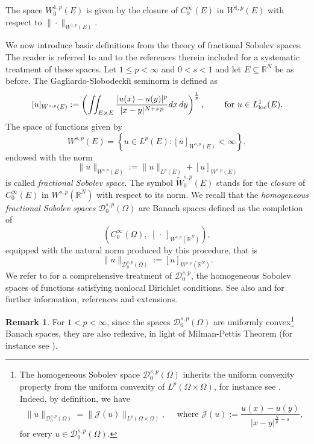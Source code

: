 \documentclass{amsart}
\theoremstyle{definition}
\newtheorem{remark}[theorem]{Remark}
\numberwithin{equation}{section}
\begin{document}
	The space $W^{1,p}_0(E)$ is given by the closure of $C^{\infty}_0(E)$ in $W^{1,p}(E)$ with respect to $\|\cdot\|_{W^{1,p}(E)}$.
	\par 
	We now introduce basic definitions from the theory of fractional Sobolev spaces. The reader is referred to \cite{Demengel_book,  EE, Grisvard_book, Leoni_fractional, Stein_book, Triebel1} and to the references therein included for a systematic treatment of these spaces. Let $1 \le p < \infty$ and $0 < s < 1$ and let $E \subseteq \mathbb{R}^N$ be as before. The Gagliardo-Slobodecki\u{\i} seminorm is defined as
	\[
	[u]_{W^{s,p}(E)}:= \left(\iint_{E \times E} \frac{|u(x) - u(y)|^p}{|x-y|^{N+s\,p}}dx\,dy\right)^{\frac{1}{p}}, \qquad \mbox{ for } u \in L^1_{\rm loc}(E). 
	\]
	The space of functions given by 
	\[
	W^{s,p}(E) = \left\{u \in L^p(E) : [u]_{W^{s,p}(E)} < \infty \right\},
	\]
	endowed with the norm 
	\[
	\|u\|_{W^{s,p}(E)} := \|u\|_{L^p(E)} + [u]_{W^{s,p}(E)}
	\]
	is called {\it fractional Sobolev space}. The symbol $\widetilde{W}_0^{s,p}(E)$ stands for the {\it closure} of $C^\infty_0(E)$ in $W^{s,p}(\mathbb{R}^N)$ with respect to its norm. We recall that the {\it homogeneous fractional Sobolev spaces} $\mathcal{D}^{s,p}_0(\Omega)$ are Banach spaces defined as the completion of 
	\[
	\left(C^\infty_0(\Omega),\,\, [\,\cdot\,]_{W^{s,p}(\mathbb{R}^N)}\right),
	\]
	equipped with the natural norm produced by this procedure, that is 
	\[
	\|u\|_{\mathcal{D}^{s,p}_0(\Omega)} := [u]_{W^{s,p}(\mathbb{R}^N)}.
	\]
	We refer to \cite{BGV} for a comprehensive treatment of $\mathcal{D}^{s,p}_0$, the homogeneous Sobolev spaces of functions satisfying nonlocal Dirichlet conditions. See also \cite{BS} and \cite[Chapter 6]{Leoni_fractional} for further information, references and extensions. 
	\begin{remark} \label{rmk:riflessivita}
		For $1 < p < \infty$, since the spaces $\mathcal{D}^{s,p}_0(\Omega)$ are uniformly convex\footnote{The homogeneous Sobolev space $\mathcal{D}^{s,p}_0(\Omega)$ inherits the uniform convexity property from the uniform convexity of $L^p(\Omega \times \Omega)$, for instance see \cite[Chapter 6, Paragraphs 11 \& 12]{DiB}. Indeed, by definition, we have $$\|u\|_{\mathcal{D}^{s,p}_0(\Omega)} = \|\mathcal{J}(u)\|_{L^p(\Omega \times \Omega)}, \quad \mbox{ where } \mathcal{J}(u) := \frac{u(x) - u(y)}{|x-y|^{\frac{N}{p} +s}},$$ 
			for every $u \in \mathcal{D}^{s,p}_0(\Omega).$}
		Banach spaces, they are also reflexive, in light of Milman-Pettis Theorem (for instance see \cite[Theorem 3.31]{Bre}). 
	\end{remark}
	
\end{document}
